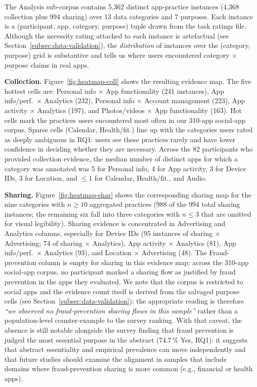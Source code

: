 \documentclass[11pt,a4paper]{article}
\begin{document}
The Analysis sub-corpus contains 5{,}362 distinct app-practice
instances (4{,}368 collection plus 994 sharing) over 13 data categories
and 7 purposes. Each instance is a (participant, app, category, purpose)
tuple drawn from the task ratings file. Although the necessity rating
attached to each instance is artefactual (see
Section~\ref{subsec:data-validation}), the \emph{distribution} of
instances over the (category, purpose) grid is substantive and tells us
where users encountered category $\times$ purpose claims in real apps.




\textbf{Collection.} Figure~\ref{fig:heatmap-coll} shows the resulting
evidence map. The five hottest cells are: Personal info $\times$ App
functionality (241 instances), App info/perf.\ $\times$ Analytics (232),
Personal info $\times$ Account management (223), App activity $\times$
Analytics (197), and Photos/videos $\times$ App functionality (163).
Hot cells mark the practices users encountered most often in our
310-app social-app corpus. Sparse cells (Calendar, Health/fit.) line up
with the categories users rated as deeply ambiguous in RQ1: users see
these practices rarely and have lower confidence in deciding whether
they are necessary. Across the 82 participants who provided collection
evidence, the median number of distinct apps for which a category was
annotated was 5 for Personal info, 4 for App activity, 3 for Device IDs,
3 for Location, and $\leq 1$ for Calendar, Health/fit., and Audio.

\textbf{Sharing.} Figure~\ref{fig:heatmap-shar} shows the corresponding
sharing map for the nine categories with $n\geq 10$ aggregated
practices (988 of the 994 total sharing instances; the remaining six
fall into three categories with $n\leq 3$ that are omitted for visual
legibility). Sharing evidence is concentrated in Advertising and
Analytics columns, especially for Device IDs (95 instances of sharing
$\times$ Advertising; 74 of sharing $\times$ Analytics), App activity
$\times$ Analytics (81), App info/perf.\ $\times$ Analytics (93), and
Location $\times$ Advertising (48). The Fraud-prevention column is
empty for sharing in this evidence map: across the 310-app social-app
corpus, no participant marked a sharing flow as justified by fraud
prevention in the apps they evaluated. We note that the corpus is
restricted to social apps and the evidence count itself is derived
from the salvaged purpose cells (see
Section~\ref{subsec:data-validation}); the appropriate reading is
therefore \emph{``we observed no fraud-prevention sharing flows in
this sample''} rather than a population-level counter-example to the
survey ranking. With that caveat, the absence is still notable
alongside the survey finding that fraud prevention is judged the most
essential purpose in the abstract (74.7\,\% Yes, RQ1): it suggests
that abstract essentiality and empirical prevalence can move
independently and that future studies should examine the alignment in
samples that include domains where fraud-prevention sharing is more
common (e.g., financial or health apps).
\end{document}
